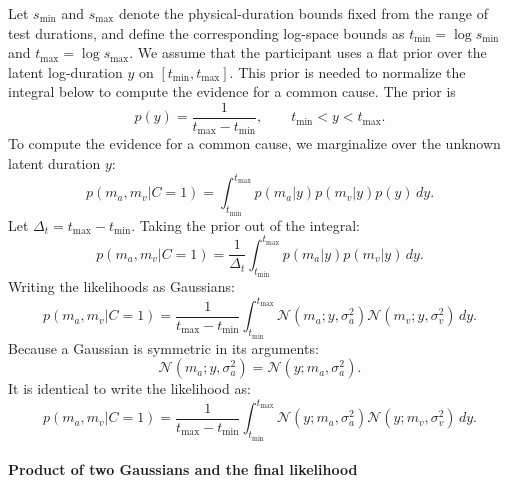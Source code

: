 \documentclass{biorxiv}
\begin{document}
Let $s_{\min}$ and $s_{\max}$ denote the physical-duration bounds fixed from the range of test durations, and define the corresponding log-space bounds as $t_{\min}=\log s_{\min}$ and $t_{\max}=\log s_{\max}$. We assume that the participant uses a flat prior over the latent log-duration $y$ on $[t_{\min},t_{\max}]$. This prior is needed to normalize the integral below to compute the evidence for a common cause. The prior is
\begin{equation}
p(y) = \frac{1}{t_{\max} - t_{\min}},
\qquad t_{\min}<y<t_{\max}.
\end{equation}
To compute the evidence for a common cause, we marginalize over the unknown latent duration $y$:
\begin{equation}
\label{eq:likelihood_c1_integral}
p(m_a, m_v | C=1) = \int_{t_{\min}}^{t_{\max}} p(m_a | y) p(m_v | y) p(y) \, dy.
\end{equation}
Let $\Delta_t = t_{\max} - t_{\min}$. Taking the prior out of the integral:
\begin{equation}
p(m_a, m_v | C=1)
= \frac{1}{\Delta_t} \int_{t_{\min}}^{t_{\max}} p(m_a | y) p(m_v | y) \, dy.
\end{equation}
Writing the likelihoods as Gaussians:
\begin{equation}
p(m_a, m_v | C=1) = \frac{1}{t_{\max} - t_{\min}} \int_{t_{\min}}^{t_{\max}} \mathcal{N}(m_a; y, \sigma_a^2) \mathcal{N}(m_v; y, \sigma_v^2) \, dy.
\end{equation}
Because a Gaussian is symmetric in its arguments:
\begin{equation}
\mathcal{N}(m_a; y, \sigma_a^2) = \mathcal{N}(y; m_a, \sigma_a^2).
\end{equation}
It is identical to write the likelihood as:
\begin{equation}
p(m_a, m_v | C=1) = \frac{1}{t_{\max} - t_{\min}} \int_{t_{\min}}^{t_{\max}} \mathcal{N}(y; m_a, \sigma_a^2) \mathcal{N}(y; m_v, \sigma_v^2) \, dy.
\end{equation}

\paragraph{Product of two Gaussians and the final likelihood}
\end{document}
